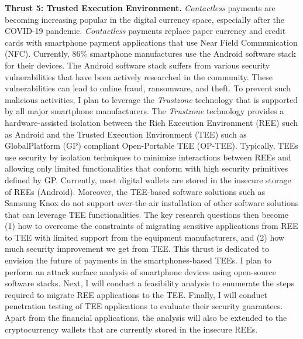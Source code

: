 \documentclass{NSF}
\newcommand{\BfPara}[1]{{\noindent\textbf{#1.}}\xspace}
\begin{document}
\BfPara{Thrust 5: Trusted Execution Environment} {\em Contactless} payments are becoming increasing popular in the digital currency space, especially after the COVID-19 pandemic. {\em Contactless} payments replace paper currency and credit cards with smartphone payment applications that use Near Field Communication (NFC). Currently, 86\% smartphone manufactures use the Android software stack for their devices. The Android software stack suffers from various security vulnerabilities that have been actively researched in the community. These vulnerabilities can lead to online fraud, ransomware, and theft. To prevent such malicious activities, I plan to leverage the {\em Trustzone} technology that is supported by all major smartphone manufacturers. The {\em Trustzone} technology provides a hardware-assisted isolation between the Rich Execution Environment (REE) such as Android and the Trusted Execution Environment (TEE) such as GlobalPlatform (GP) compliant Open-Portable TEE (OP-TEE). Typically, TEEs use security by isolation techniques to minimize interactions between REEs and allowing only limited functionalities that conform with high security primitives defined by GP. Currently, most digital wallets are stored in the insecure storage of REEs (Android). Moreover, the TEE-based software solutions such as Samsung Knox do not support over-the-air installation of other software solutions that can leverage TEE functionalities. The key research questions then become (1) how to overcome the constraints of migrating sensitive applications from REE to TEE with limited support from the equipment manufacturers, and (2) how much security improvement we get from TEE. This thrust is dedicated to envision the future of payments in the smartphones-based TEEs. I plan to perform an attack surface analysis of smartphone devices using open-source software stacks. Next, I will conduct a feasibility analysis to enumerate the steps required to migrate REE applications to the TEE. Finally, I will conduct penetration testing of TEE applications to evaluate their security guarantees. Apart from the financial applications, the analysis will also be extended to the cryptocurrency wallets that are currently stored in the insecure REEs. 
\end{document}
